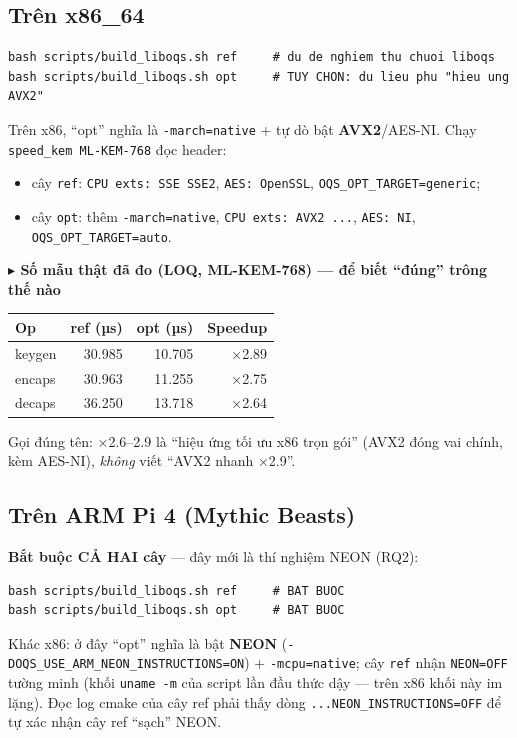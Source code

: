 \documentclass[11pt,a4paper]{article}
\newcommand{\tip}[1]{\par\smallskip\noindent\textcolor{accent}{\textbf{\small$\blacktriangleright$ #1}}\par}
\begin{document}
\subsection*{Trên x86\_64}
\begin{lstlisting}
bash scripts/build_liboqs.sh ref     # du de nghiem thu chuoi liboqs
bash scripts/build_liboqs.sh opt     # TUY CHON: du lieu phu "hieu ung AVX2"
\end{lstlisting}
Trên x86, ``opt'' nghĩa là \verb|-march=native| + tự dò bật \textbf{AVX2}/AES-NI. Chạy \verb|speed_kem ML-KEM-768| đọc header:
\begin{itemize}
  \item cây \verb|ref|: \verb|CPU exts: SSE SSE2|, \verb|AES: OpenSSL|, \verb|OQS_OPT_TARGET=generic|;
  \item cây \verb|opt|: thêm \verb|-march=native|, \verb|CPU exts: AVX2 ...|, \verb|AES: NI|, \verb|OQS_OPT_TARGET=auto|.
\end{itemize}

\tip{Số mẫu thật đã đo (LOQ, ML-KEM-768) — để biết ``đúng'' trông thế nào}
\begin{center}\small
\begin{tabular}{lrrr}
\toprule
Op & ref (µs) & opt (µs) & Speedup \\
\midrule
keygen & 30.985 & 10.705 & ×2.89 \\
encaps & 30.963 & 11.255 & ×2.75 \\
decaps & 36.250 & 13.718 & ×2.64 \\
\bottomrule
\end{tabular}
\end{center}
Gọi đúng tên: ×2.6–2.9 là ``hiệu ứng tối ưu x86 trọn gói'' (AVX2 đóng vai chính, kèm AES-NI), \emph{không} viết ``AVX2 nhanh ×2.9''.

\subsection*{Trên ARM Pi 4 (Mythic Beasts)}
\textbf{Bắt buộc CẢ HAI cây} — đây mới là thí nghiệm NEON (RQ2):
\begin{lstlisting}
bash scripts/build_liboqs.sh ref     # BAT BUOC
bash scripts/build_liboqs.sh opt     # BAT BUOC
\end{lstlisting}
Khác x86: ở đây ``opt'' nghĩa là bật \textbf{NEON} (\verb|-DOQS_USE_ARM_NEON_INSTRUCTIONS=ON|) + \verb|-mcpu=native|; cây \verb|ref| nhận \verb|NEON=OFF| tường minh (khối \verb|uname -m| của script lần đầu thức dậy — trên x86 khối này im lặng). Đọc log cmake của cây ref phải thấy dòng \verb|...NEON_INSTRUCTIONS=OFF| để tự xác nhận cây ref ``sạch'' NEON.
\end{document}
